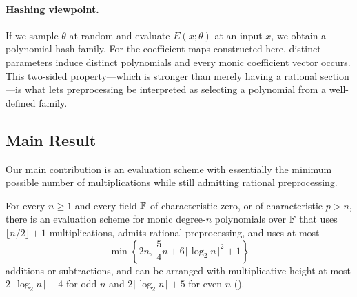\paragraph{Hashing viewpoint.}
If we sample $\theta$ at random and evaluate $E(x;\theta)$ at an input $x$, we obtain a polynomial-hash family.
For the coefficient maps constructed here, distinct parameters induce
distinct polynomials and every monic coefficient vector occurs.  This
two-sided property---which is stronger than merely having a rational
section---is what lets preprocessing be interpreted as selecting a polynomial
from a well-defined family.

\subsection{Main Result}
\label{sec:main-theorem}

Our main contribution is an evaluation scheme with essentially the minimum possible number of multiplications while still admitting rational preprocessing.

\begin{theorem}
\label{thm:main}
For every $n\ge 1$ and every field $\mathbb{F}$ of characteristic zero, or of characteristic $p>n$, there is an evaluation scheme for monic degree-$n$ polynomials over $\mathbb{F}$ that uses $\lfloor n/2\rfloor+1$ multiplications, admits rational preprocessing, and uses at most
\[
  \min\left\{2n,\ \frac54n+6\lceil\log_2n\rceil^2+1\right\}
\]
additions or subtractions, and can be arranged with multiplicative
height at most $2\lceil\log_2 n\rceil+4$ for odd $n$ and
$2\lceil\log_2 n\rceil+5$ for even $n$
().
\end{theorem}


